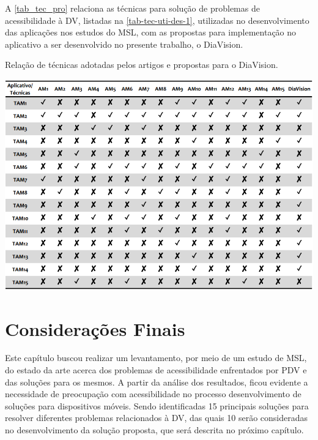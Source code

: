 A \autoref{tab_tec_pro} relaciona as técnicas para solução de problemas de acessibilidade à DV, listadas na \autoref{tab-tec-uti-des-1},
utilizadas no desenvolvimento das aplicações nos estudos do MSL, com as propostas para implementação no aplicativo
a ser desenvolvido no presente trabalho, o DiaVision.
\begin{table}
      \caption{Relação de técnicas adotadas pelos artigos e propostas para o DiaVision.}
      \label{tab_tec_pro}
      \begin{center}
            \includegraphics[scale=0.68]{Imagens/proposta/tecnicas_propostas.png}
      \end{center}
\end{table}

\section{Considerações Finais}

Este capítulo buscou realizar um levantamento, por meio de um estudo de MSL, do estado da arte
acerca dos problemas de acessibilidade enfrentados por PDV e das soluções para os mesmos.
A partir da análise dos resultados, ficou evidente a necessidade de preocupação com
acessibilidade no processo desenvolvimento de soluções para dispositivos móveis.
Sendo identificadas 15 principais soluções para resolver diferentes problemas relacionados à DV,
das quais 10 serão consideradas no desenvolvimento da solução proposta,
que será descrita no próximo capítulo.